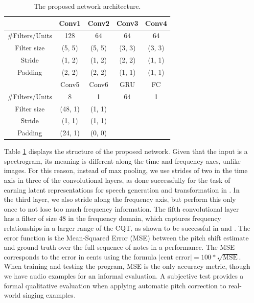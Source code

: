 \begin{table}[t]
  \begin{center}
    \caption{The proposed network architecture.}
    \begin{tabular}{|c||c|c|c|c|}
    \hline
      & Conv1 & Conv2 & Conv3 & Conv4 \\
      \hline
      \#Filters/Units & 128 & 64 & 64 & 64 \\
      Filter size & (5, 5) & (5, 5) & (3, 3) & (3, 3) \\
      Stride & (1, 2) & (1, 2) & (2, 2) & (1, 1) \\
      Padding & (2, 2) & (2, 2) & (1, 1) & (1, 1) \\
      \hline
      & Conv5 & Conv6 & GRU & FC \\
      \hline
      \#Filters/Units & 8 & 1 & 64 & 1 \\
      Filter size & (48, 1) & (1, 1) & & \\
      Stride & (1, 1) & (1, 1) & & \\
      Padding & (24, 1) & (0, 0) & & \\
      \hline
    \end{tabular}
    \vspace{-.1in}
    \label{tab:network}
  \end{center}
\end{table}

Table \ref{tab:network} displays the structure of the proposed network. Given that the input is a spectrogram, its meaning is different along the time and frequency axes, unlike images. For this reason, instead of max pooling, we use strides of two in the time axis in three of the convolutional layers, as done successfully for the task of earning latent representations for speech generation and transformation in \cite{hsu2017learning}. In the third layer, we also stride along the frequency axis, but perform this only once to not lose too much frequency information. The fifth convolutional layer has a filter of size 48 in the frequency domain, which captures frequency relationships in a larger range of the CQT, as shown to be successful in \cite{bittner2017deep} and \cite{hsu2017learning}. 
The error function is the Mean-Squared Error (MSE) between the pitch shift estimate and ground truth over the full sequence of notes in a performance. The MSE corresponds to the error in cents using the formula $\left|\text{cent error}\right| = 100 * \sqrt{\text{MSE}}$. When training and testing the program, MSE is the only accuracy metric, though we have audio examples for an informal evaluation. A subjective test provides a formal qualitative evaluation when applying automatic pitch correction to real-world singing examples.

